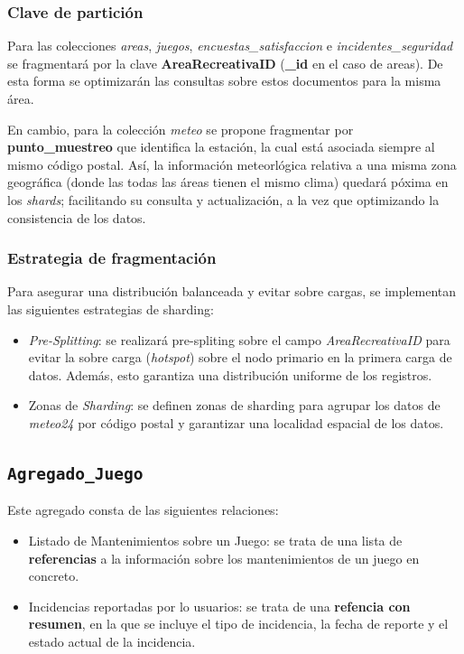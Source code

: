 \documentclass[]{article}
\begin{document}
\subsubsection{Clave de partición}
\label{subsubsec:particion_areas}

Para las colecciones \textit{areas}, \textit{juegos}, \textit{encuestas\_satisfaccion} e \textit{incidentes\_seguridad} se fragmentará por la clave \textbf{AreaRecreativaID} (\textbf{\_id} en el caso de areas). De esta forma se optimizarán las consultas sobre estos documentos para la misma área. 

En cambio, para la colección \textit{meteo} se propone fragmentar por \textbf{punto\_muestreo} que identifica la estación, la cual está asociada siempre al mismo código postal. Así, la información meteorlógica relativa a una misma zona geográfica (donde las todas las áreas tienen el mismo clima)  quedará póxima en los \textit{shards}; facilitando su consulta y actualización, a la vez que optimizando la consistencia de los datos.

\subsubsection{Estrategia de fragmentación}
\label{subsubsec:fragmentacion_areas}

Para asegurar una distribución balanceada y evitar sobre cargas, se implementan las siguientes estrategias de sharding:
\begin{itemize}
    \item \textit{Pre-Splitting}: se realizará pre-spliting sobre el campo \textit{AreaRecreativaID} para evitar la sobre carga (\textit{hotspot}) sobre el nodo primario en la primera carga de datos. Además, esto garantiza una distribución uniforme de los registros.
    \item Zonas de \textit{Sharding}: se definen zonas de sharding para agrupar los datos de \textit{meteo24} por código postal y garantizar una localidad espacial de los datos. %
\end{itemize}


\subsection{\texttt{Agregado\_Juego}}
\label{subsec:juegos}
Este agregado consta de las siguientes relaciones:
\begin{itemize}
    \item Listado de Mantenimientos sobre un Juego: se trata de una lista de \textbf{referencias} a la información sobre los mantenimientos de un juego en concreto.
    \item Incidencias reportadas por lo usuarios: se trata de una \textbf{refencia con resumen}, en la que se incluye el tipo de incidencia, la fecha de reporte y el estado actual de la incidencia.
\end{itemize}
\end{document}
